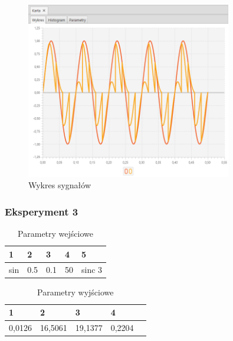\documentclass[12pt]{article}
\begin{document}
{{{                \begin{figure}[H]
                    \centering
                    \includegraphics[width=0.8\textwidth]{img/result/experiment4/02/data_draw_original_chart_recon_output_130556.png}
                    \caption{Wykres sygnałów}
                \end{figure}
            }
            \newpage

            \subsubsection{Eksperyment 3} {
                \begin{table}[H]
                    \centering
                    \begin{tabular}{|l|l|l|l|l|}
                        \hline
                        1 & 2 & 3 & 4 & 5   \\ \hline
                        sin & 0.5 & 0.1 & 50 & sinc 3  \\ \hline
                    \end{tabular}
                    \caption{Parametry wejściowe}
                \end{table}

                \begin{table}[H]
                    \centering
                    \begin{tabular}{|l|l|l|l|l|}
                        \hline
                        1 & 2 & 3 & 4   \\ \hline
                        0,0126 & 16,5061 & 19,1377 & 0,2204 \\ \hline
                    \end{tabular}
                    \caption{Parametry wyjściowe}
                \end{table}


}}}
\end{document}
